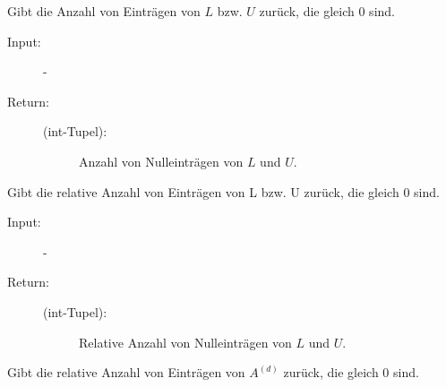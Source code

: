\documentclass[letterpaper,10pt,ngerman, oneside, openright]{sphinxmanual}
\begin{document}
\begin{fulllineitems}

\begin{fulllineitems}
\label{\detokenize{index:sparse_erw.Sparse.anz_n_lu_abs}}
Gibt die Anzahl von Einträgen von $L$ bzw. $U$ zurück, die gleich $0$ sind.

\begin{description}
\item [{Input:}] -
\end{description}
\begin{description}
\item[{Return:}] \leavevmode\begin{description}
\item[{(int-Tupel):}] \leavevmode
Anzahl von Nulleinträgen von $L$ und $U$.

\end{description}

\end{description}

\end{fulllineitems}
\clearpage
{}

\begin{fulllineitems}
\label{\detokenize{index:sparse_erw.Sparse.anz_n_lu_rel}}
Gibt die relative Anzahl von Einträgen von L bzw. U zurück, die gleich 0 sind.

\begin{description}
\item [{Input:}] -
\end{description}
\begin{description}
\item[{Return:}] \leavevmode\begin{description}
\item[{(int-Tupel):}] \leavevmode
Relative Anzahl von Nulleinträgen von $L$ und $U$.

\end{description}

\end{description}

\end{fulllineitems}


\begin{fulllineitems}
\label{\detokenize{index:sparse_erw.Sparse.anz_n_rel}}
Gibt die relative Anzahl von Einträgen von $A^{(d)}$ zurück, die gleich 0 sind.


\end{fulllineitems}
\end{fulllineitems}
\end{document}
